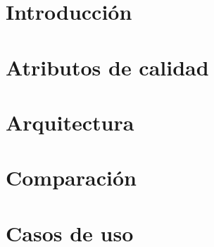 \documentclass[10pt, a4paper]{article}
\begin{document}
\maketitle
\tableofcontents
\newpage

\section{Introducción}

	

\section{Atributos de calidad}
	\label{sec:calidad}

	

\section{Arquitectura}
	\label{sec:arquitectura}



\section{Comparación}
	\label{sec:comparacion}

	

\section{Casos de uso}
	\label{sec:cu}

	
\end{document}
